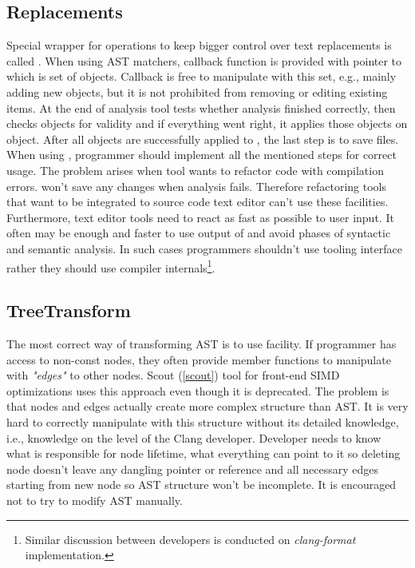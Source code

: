 \subsection{Replacements}
Special wrapper for  operations to keep bigger control over text replacements is called . When using AST matchers, callback function is provided with pointer to  which is set of  objects. Callback is free to manipulate with this set, e.g.,  mainly adding new objects, but it is not prohibited from removing or editing existing items. At the end of analysis tool tests whether analysis finished correctly, then checks  objects for validity and if everything went right, it applies those objects on  object. After all objects are successfully applied to , the last step is to save files. When using , programmer should implement all the mentioned steps for correct usage. The problem arises when tool wants to refactor code with compilation errors.  won't save any changes when analysis fails. Therefore refactoring tools that want to be integrated to source code text editor can't use these facilities. Furthermore, text editor tools need to react as fast as possible to user input. It often may be enough and faster to use output of  and avoid phases of syntactic and semantic analysis. In such cases programmers shouldn't use tooling interface rather they should use compiler internals\footnote{Similar discussion between developers is conducted on \emph{clang-format} implementation.}.

\subsection{TreeTransform}
The most correct way of transforming AST is to use  facility. If programmer has access to non-const nodes, they often provide member functions to manipulate with \textit{"edges"} to other nodes. Scout (\ref{scout}) tool for front-end SIMD optimizations uses this approach even though it is deprecated. The problem is that nodes and edges actually create more complex structure than AST. It is very hard to correctly manipulate with this structure without its detailed knowledge, i.e., knowledge on the level of the Clang developer. Developer needs to know what is responsible for node lifetime, what everything can point to it so deleting node doesn't leave any dangling pointer or reference and all necessary edges starting from new node so AST structure won't be incomplete. It is encouraged not to try to modify AST manually.


